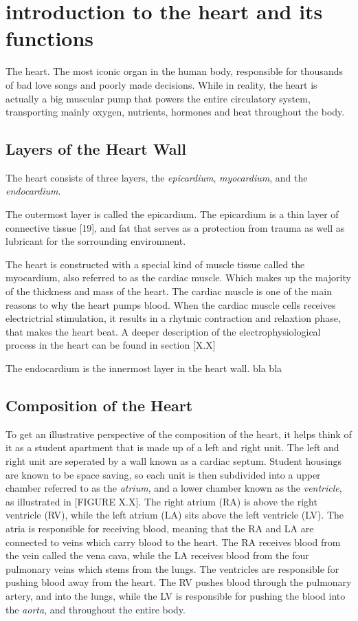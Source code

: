 \section{introduction to the heart and its functions}
The heart. The most iconic organ in the human body, responsible for thousands of bad love songs and poorly made decisions. While in reality, the heart is actually a big muscular pump that powers the entire circulatory system, transporting mainly oxygen, nutrients, hormones and heat throughout the body. 

\subsection{Layers of the Heart Wall}
The heart consists of three layers, the \textit{epicardium}, \textit{myocardium}, and the \textit{endocardium}. 

The outermost layer is called the epicardium. The epicardium is a thin layer of connective tissue [19], and fat that serves as a protection from trauma as well as lubricant for the sorrounding environment. 

The heart is constructed with a special kind of muscle tissue called the myocardium, also referred to as the cardiac muscle. Which makes up the majority of the thickness and mass of the heart. The cardiac muscle is one of the main reasons to why the heart pumps blood. When the cardiac muscle cells receives electrictrial stimulation, it results in a rhytmic contraction and relaxtion phase, that makes the heart beat. A deeper description of the electrophysiological process in the heart can be found in section [X.X]

The endocardium is the innermost layer in the heart wall. bla bla


\subsection{Composition of the Heart}
To get an illustrative perspective of the composition of the heart, it helps think of it as a student apartment that is made up of a left and right unit. The left and right unit are seperated by a wall known as a cardiac septum. Student housings are known to be space saving, so each unit is then subdivided into a upper chamber referred to as the \textit{atrium}, and a lower chamber known as the \textit{ventricle}, as illustrated in [FIGURE X.X]. The right atrium (RA) is above the right ventricle (RV), while the left atrium (LA) sits above the left ventricle (LV). The atria is responsible for receiving blood, meaning that the RA and LA are connected to veins which carry blood to the heart. The RA receives blood from the vein called the vena cava, while the LA receives blood from the four pulmonary veins which stems from the lungs. The ventricles are responsible for pushing blood away from the heart. The RV pushes blood through the pulmonary artery, and into the lungs, while the LV is responsible for pushing the blood into the \textit{aorta}, and throughout the entire body.

